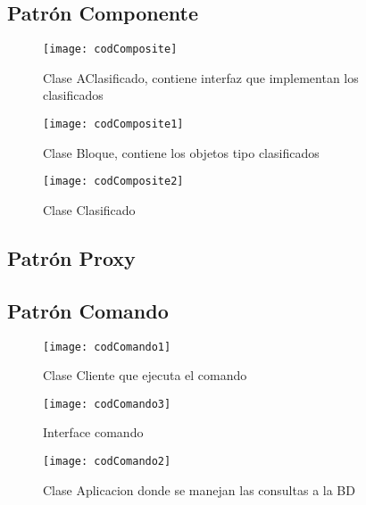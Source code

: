 \subsection{Patrón Componente}
\begin{figure}[H]
	
	\texttt{[image: codComposite]}
	
	\caption{Clase AClasificado, contiene interfaz que implementan los clasificados}
	\label{fig:codSingleton2}
\end{figure}
\clearpage
\begin{figure}[H]
	\centering
	\texttt{[image: codComposite1]}
	\centering
	\caption{Clase Bloque, contiene los objetos tipo clasificados}
	\label{fig:codSingleton2}
\end{figure}
\begin{figure}[H]
	\centering
	\texttt{[image: codComposite2]}
	\centering
	\caption{Clase Clasificado}
	\label{fig:codSingleton2}
\end{figure}
\subsection{Patrón Proxy}







\subsection{Patrón Comando}
\begin{figure}[H]

	\texttt{[image: codComando1]}

	\caption{Clase Cliente que ejecuta el comando}
	\label{fig:codComando1}
\end{figure}
\begin{figure}[H]

	\texttt{[image: codComando3]}

	\caption{Interface comando}
	\label{fig:codComando3}
	
\end{figure}
\clearpage
\begin{figure}[H]

	\texttt{[image: codComando2]}

	\caption{Clase Aplicacion donde se manejan las consultas a la BD}
	\label{fig:codComando2}
\end{figure}

